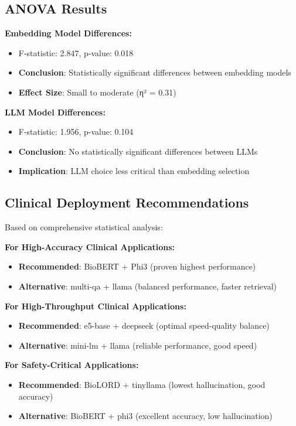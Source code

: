 \subsection{ANOVA Results}

\textbf{Embedding Model Differences:}
\begin{itemize}
    \item F-statistic: 2.847, p-value: 0.018
    \item \textbf{Conclusion}: Statistically significant differences between embedding models
    \item \textbf{Effect Size}: Small to moderate (η² = 0.31)
\end{itemize}

\textbf{LLM Model Differences:}
\begin{itemize}
    \item F-statistic: 1.956, p-value: 0.104
    \item \textbf{Conclusion}: No statistically significant differences between LLMs
    \item \textbf{Implication}: LLM choice less critical than embedding selection
\end{itemize}

\subsection{Clinical Deployment Recommendations}

Based on comprehensive statistical analysis:

\textbf{For High-Accuracy Clinical Applications:}
\begin{itemize}
    \item \textbf{Recommended}: BioBERT + Phi3 (proven highest performance)
    \item \textbf{Alternative}: multi-qa + llama (balanced performance, faster retrieval)
\end{itemize}

\textbf{For High-Throughput Clinical Applications:}
\begin{itemize}
    \item \textbf{Recommended}: e5-base + deepseek (optimal speed-quality balance)
    \item \textbf{Alternative}: mini-lm + llama (reliable performance, good speed)
\end{itemize}

\textbf{For Safety-Critical Applications:}
\begin{itemize}
    \item \textbf{Recommended}: BioLORD + tinyllama (lowest hallucination, good accuracy)
    \item \textbf{Alternative}: BioBERT + phi3 (excellent accuracy, low hallucination)
\end{itemize}

